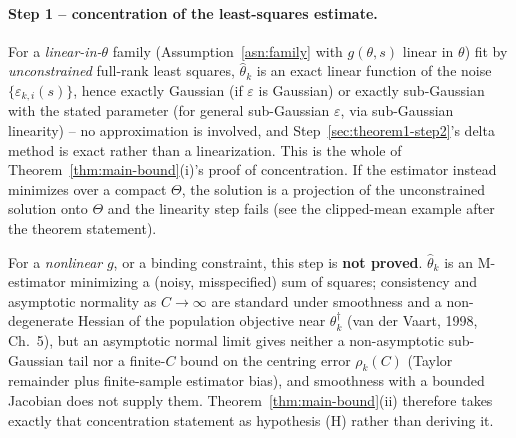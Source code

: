 \paragraph{Step 1 -- concentration of the least-squares estimate.}
\label{sec:theorem1-step1}
For a \emph{linear-in-$\theta$} family (Assumption~\ref{asn:family} with $g(\theta, s)$
linear in $\theta$) fit by \emph{unconstrained} full-rank least squares, $\hat\theta_k$ is
an exact linear function of the noise $\{\varepsilon_{k,i}(s)\}$, hence exactly Gaussian
(if $\varepsilon$ is Gaussian) or exactly sub-Gaussian with the stated parameter (for
general sub-Gaussian $\varepsilon$, via sub-Gaussian linearity) -- no approximation is
involved, and Step~\ref{sec:theorem1-step2}'s delta method is exact rather than a
linearization. This is the whole of Theorem~\ref{thm:main-bound}(i)'s proof of
concentration. If the estimator instead minimizes over a compact $\Theta$, the
solution is a projection of the unconstrained solution onto $\Theta$ and the linearity
step fails (see the clipped-mean example after the theorem statement).

For a \emph{nonlinear} $g$, or a binding constraint, this step is \textbf{not proved}. $\hat\theta_k$ is an
M-estimator minimizing a (noisy, misspecified) sum of squares; consistency and
asymptotic normality as $C \to \infty$ are standard under smoothness and a non-degenerate
Hessian of the population objective near $\theta_k^{\dagger}$ (van der Vaart, 1998,
Ch.~5), but an asymptotic normal limit gives neither a non-asymptotic sub-Gaussian tail
nor a finite-$C$ bound on the centring error $\rho_k(C)$ (Taylor remainder plus
finite-sample estimator bias), and smoothness with a bounded Jacobian does not supply
them. Theorem~\ref{thm:main-bound}(ii) therefore takes exactly that concentration
statement as hypothesis (H) rather than deriving it.


